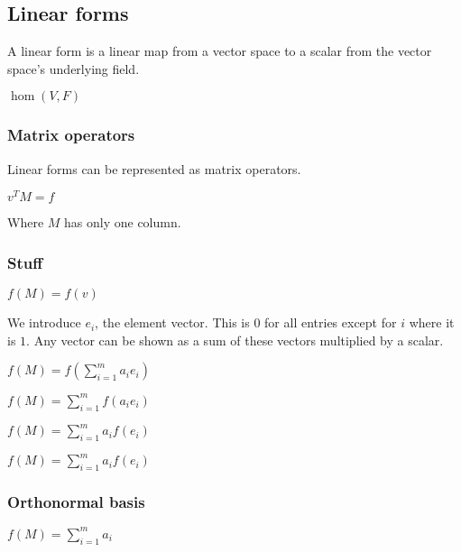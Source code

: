 
\subsection{Linear forms}

A linear form is a linear map from a vector space to a scalar from the vector space's underlying field.

\(\hom (V, F)\)

\subsubsection{Matrix operators}

Linear forms can be represented as matrix operators.

\(v^TM=f\)

Where \(M\) has only one column.

\subsubsection{Stuff}

\(f(M)=f(v)\)

We introduce \(e_i\), the element vector. This is \(0\) for all entries except for \(i\) where it is \(1\). Any vector can be shown as a sum of these vectors multiplied by a scalar.

\(f(M)=f(\sum^m_{i=1}a_{i}e_i)\)

\(f(M)=\sum_{i=1}^mf(a_{i}e_i)\)

\(f(M)=\sum_{i=1}^ma_if(e_i)\)

\(f(M)=\sum_{i=1}^ma_if(e_i)\)

\subsubsection{Orthonormal basis}

\(f(M)=\sum_{i=1}^ma_i\)

